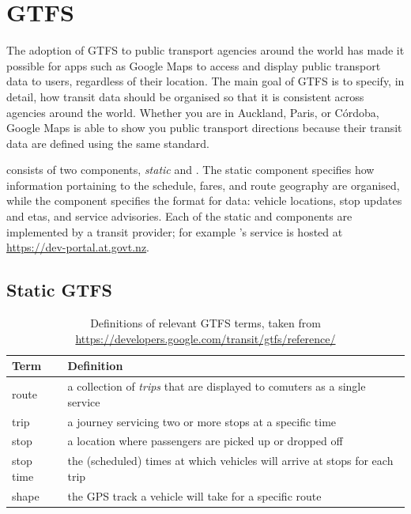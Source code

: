 \section{GTFS}
\label{sec:gtfs}

The adoption of GTFS \citep{GoogleDevelopers_2006} to public transport agencies around the world has made it possible for apps such as Google Maps to access and display public transport data to users, regardless of their location. The main goal of GTFS is to specify, in detail, how transit data should be organised so that it is consistent across agencies around the world. Whether you are in Auckland, Paris, or C\'ordoba, Google Maps is able to show you public transport directions because their transit data are defined using the same standard.


\GTFS{} consists of two components, \emph{static} and \emph{\rt{}}. The static component specifies how information portaining to the schedule, fares, and route geography are organised, while the \emph{\rt{}} component specifies the format for \rt{} data: vehicle locations, stop updates and \glspl{eta}, and service advisories. Each of the static and \rt{} components are implemented by a transit provider; for example \AT{}'s \GTFS{} service is hosted at \url{https://dev-portal.at.govt.nz}.


\subsection{Static GTFS}
\label{sec:gtfs_static}


\begin{table}[t]
\centering
\begin{tabular}{ll}
\toprule
Term & Definition \\
\midrule
route & a collection of \emph{trips} that are displayed to comuters
as a single service \\
trip & a journey servicing two or more stops at a specific time \\
stop & a location where passengers are picked up or dropped off \\
stop time & the (scheduled) times at which vehicles
will arrive at stops for each trip \\
shape & the GPS track a vehicle will take for a specific route \\
\bottomrule
\end{tabular}
\caption{Definitions of relevant GTFS terms, taken from\\
\url{https://developers.google.com/transit/gtfs/reference/}}
\label{tab:gtfs_terms}
\end{table}



